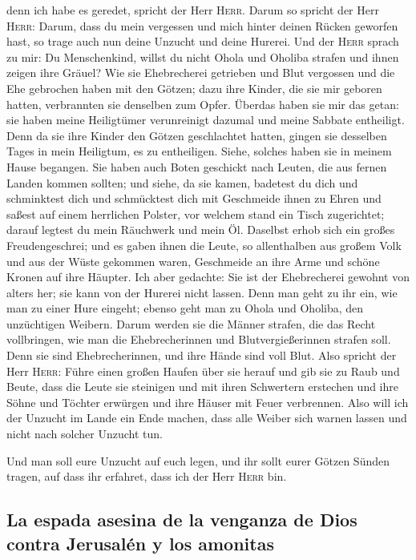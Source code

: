denn ich habe es geredet, spricht der Herr \textsc{Herr}.
 Darum so spricht der Herr \textsc{Herr}: Darum, dass du
mein vergessen und mich hinter deinen Rücken geworfen hast, so trage
auch nun deine Unzucht und deine Hurerei.  Und der
\textsc{Herr} sprach zu mir: Du Menschenkind, willst du nicht Ohola und
Oholiba strafen und ihnen zeigen ihre Gräuel?  Wie sie
Ehebrecherei getrieben und Blut vergossen und die Ehe gebrochen haben
mit den Götzen; dazu ihre Kinder, die sie mir geboren hatten,
verbrannten sie denselben zum Opfer.  Überdas haben sie
mir das getan: sie haben meine Heiligtümer verunreinigt dazumal und
meine Sabbate entheiligt.  Denn da sie ihre Kinder den
Götzen geschlachtet hatten, gingen sie desselben Tages in mein
Heiligtum, es zu entheiligen. Siehe, solches haben sie in meinem Hause
begangen.  Sie haben auch Boten geschickt nach Leuten,
die aus fernen Landen kommen sollten; und siehe, da sie kamen, badetest
du dich und schminktest dich und schmücktest dich mit Geschmeide ihnen
zu Ehren  und saßest auf einem herrlichen Polster, vor
welchem stand ein Tisch zugerichtet; darauf legtest du mein Räuchwerk
und mein Öl.  Daselbst erhob sich ein großes
Freudengeschrei; und es gaben ihnen die Leute, so allenthalben aus
großem Volk und aus der Wüste gekommen waren, Geschmeide an ihre Arme
und schöne Kronen auf ihre Häupter.  Ich aber gedachte:
Sie ist der Ehebrecherei gewohnt von alters her; sie kann von der
Hurerei nicht lassen.  Denn man geht zu ihr ein, wie man
zu einer Hure eingeht; ebenso geht man zu Ohola und Oholiba, den
unzüchtigen Weibern.  Darum werden sie die Männer
strafen, die das Recht vollbringen, wie man die Ehebrecherinnen und
Blutvergießerinnen strafen soll. Denn sie sind Ehebrecherinnen, und ihre
Hände sind voll Blut.  Also spricht der Herr
\textsc{Herr}: Führe einen großen Haufen über sie herauf und gib sie zu
Raub und Beute,  dass die Leute sie steinigen und mit
ihren Schwertern erstechen und ihre Söhne und Töchter erwürgen und ihre
Häuser mit Feuer verbrennen.  Also will ich der Unzucht
im Lande ein Ende machen, dass alle Weiber sich warnen lassen und nicht
nach solcher Unzucht tun.

 Und man soll eure Unzucht auf euch legen, und ihr sollt
eurer Götzen Sünden tragen, auf dass ihr erfahret, dass ich der Herr
\textsc{Herr} bin.

\hypertarget{la-espada-asesina-de-la-venganza-de-dios-contra-jerusaluxe9n-y-los-amonitas}{%
\subsection{La espada asesina de la venganza de Dios contra Jerusalén y
los
amonitas}\label{la-espada-asesina-de-la-venganza-de-dios-contra-jerusaluxe9n-y-los-amonitas}}

